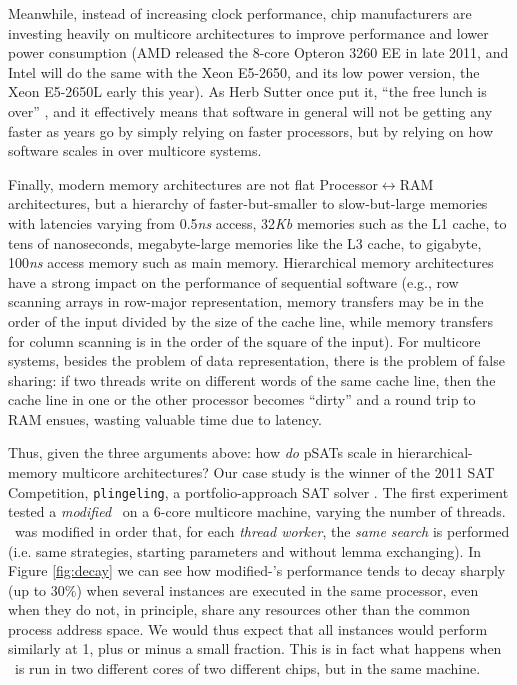 \documentclass{llncs}
\begin{document}
Meanwhile, instead of increasing clock performance, chip manufacturers
are investing heavily on multicore architectures to improve
performance and lower power consumption (AMD released the 8-core
Opteron 3260 EE in late 2011, and Intel will do the same with the Xeon
E5-2650, and its low power version, the Xeon E5-2650L early this
year). As Herb Sutter once put it, ``the free lunch is over''
\cite{FreeLunchIsOver}, and it effectively means that software in
general will not be getting any faster as years go by simply
relying on faster processors, but by relying on how software scales in
over multicore systems.

Finally, modern memory architectures are not flat
Processor$\leftrightarrow$RAM architectures, but a hierarchy of
faster-but-smaller to slow-but-large memories with latencies varying
from 0.5{\it ns} access, 32{\it Kb} memories such as the L1 cache, to
tens of nanoseconds, megabyte-large memories like the L3 cache, to
gigabyte, 100{\it ns} access memory such as main memory. Hierarchical
memory architectures have a strong impact on the performance of
sequential software (e.g., row scanning arrays in row-major
representation, memory transfers may be in the order of the input
divided by the size of the cache line, while memory transfers for
column scanning is in the order of the square of the input). For
multicore systems, besides the problem of data representation, there
is the problem of false sharing: if two threads write on different
words of the same cache line, then the cache line in one or the other
processor becomes ``dirty'' and a round trip to RAM ensues, wasting
valuable time due to latency.

Thus, given the three arguments above: how {\em do} pSATs scale in
hierarchical-memory multicore architectures? Our case study is the
winner of the 2011 SAT Competition, {\tt plingeling}, a
portfolio-approach SAT solver \cite{lingeling}. The first experiment
tested a \emph{modified} \pling\ on a 6-core multicore machine,
varying the number of threads. \pling\ was modified in order that, for
each {\em thread worker}, the {\em same search} is performed
(i.e. same strategies, starting parameters and without lemma
exchanging).  In Figure \ref{fig:decay} we can see how
modified-\pling's performance tends to decay sharply (up to 30\%) when
several instances are executed in the same processor, even when they
do not, in principle, share any resources other than the common
process address space. We would thus expect that all instances would
perform similarly at 1, plus or minus a small fraction. This is in
fact what happens when \pling\ is run in two different cores of two
different chips, but in the same machine.
\end{document}
